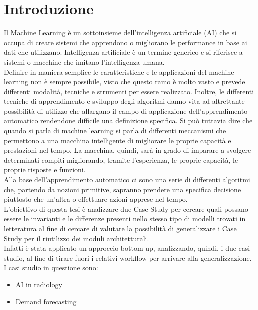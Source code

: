 \documentclass[12pt,a4paper]{report}
\begin{document}
\chapter{Introduzione}
\par
Il Machine Learning è un sottoinsieme dell'intelligenza artificiale (AI) che si occupa di creare sistemi che apprendono o migliorano le performance in base ai dati che utilizzano. Intelligenza artificiale è un termine generico e si riferisce a sistemi o macchine che imitano l'intelligenza umana.\\
Definire in maniera semplice le caratteristiche e le applicazioni del machine learning non è sempre possibile, visto che questo ramo è molto vasto e prevede differenti modalità, tecniche e strumenti per essere realizzato. Inoltre, le differenti tecniche di apprendimento e sviluppo degli algoritmi danno vita ad altrettante possibilità di utilizzo che allargano il campo di applicazione dell’apprendimento automatico rendendone difficile una definizione specifica. Si può tuttavia dire che quando si parla di machine learning si parla di differenti meccanismi che permettono a una macchina intelligente di migliorare le proprie capacità e prestazioni nel tempo. La macchina, quindi, sarà in grado di imparare a svolgere determinati compiti migliorando, tramite l’esperienza, le proprie capacità, le proprie risposte e funzioni.\\
Alla base dell’apprendimento automatico ci sono una serie di differenti algoritmi che, partendo da nozioni primitive, sapranno prendere una specifica decisione piuttosto che un’altra o effettuare azioni apprese nel tempo.\\
L'obiettivo di questa tesi è analizzare due Case Study per cercare quali possano essere le invarianti e le differenze presenti nello stesso tipo di modelli trovati in letteratura al fine di cercare di valutare la possibilità di generalizzare i Case Study per il riutilizzo dei moduli architetturali.\\
Infatti è stata applicato un approccio bottom-up, analizzando, quindi, i due casi studio, al fine di tirare fuori i relativi workflow per arrivare alla generalizzazione.\\
I casi studio in questione sono:
\begin{itemize}
    \item AI in radiology
    \item Demand forecasting
\end{itemize}
\end{document}
